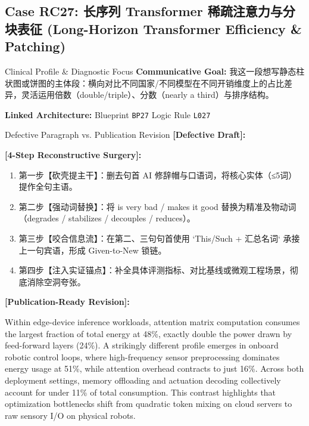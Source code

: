 \subsection{Case RC27: 长序列 Transformer 稀疏注意力与分块表征 (Long-Horizon Transformer Efficiency \& Patching)}\label{case:RC27}
\begin{ConceptBox}{Clinical Profile \& Diagnostic Focus}
\textbf{Communicative Goal:} 我这一段想写静态柱状图或饼图的主体段：横向对比不同国家/不同模型在不同开销维度上的占比差异，灵活运用倍数（double/triple）、分数（nearly a third）与排序结构。\par
\textbf{Linked Architecture:} Blueprint \texttt{BP27} \enspace\textbar\enspace Logic Rule \texttt{L027}
\end{ConceptBox}
\begin{ExampleBox}{Defective Paragraph vs. Publication Revision}
\textbf{\color{TargetHighlight}[Defective Draft]:}\par
{}\par\vspace{6pt}
\textbf{\color{AcadForest}[4-Step Reconstructive Surgery]:}
\begin{enumerate}[label=\textbf{\color{AcadNavy}Step \arabic*:}, leftmargin=2em]
  \item 第一步【砍壳提主干】：删去句首 AI 修辞帽与口语词，将核心实体（≤5词）提作全句主语。
  \item 第二步【强动词替换】：将 is very bad / makes it good 替换为精准及物动词（degrades / stabilizes / decouples / reduces）。
  \item 第三步【咬合信息流】：在第二、三句句首使用 `This/Such + 汇总名词` 承接上一句宾语，形成 Given-to-New 锁链。
  \item 第四步【注入实证锚点】：补全具体评测指标、对比基线或微观工程场景，彻底消除空洞夸张。
\end{enumerate}\vspace{4pt}
\textbf{\color{AcadNavy}[Publication-Ready Revision]:}\par
Within edge-device inference workloads, attention matrix computation consumes the largest fraction of total energy at 48\%, exactly double the power drawn by feed-forward layers (24\%). A strikingly different profile emerges in onboard robotic control loops, where high-frequency sensor preprocessing dominates energy usage at 51\%, while attention overhead contracts to just 16\%. Across both deployment settings, memory offloading and actuation decoding collectively account for under 11\% of total consumption. This contrast highlights that optimization bottlenecks shift from quadratic token mixing on cloud servers to raw sensory I/O on physical robots.
\end{ExampleBox}
